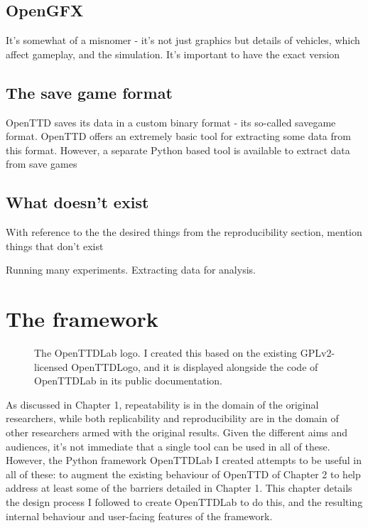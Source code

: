 \documentclass[logo,msc,dsti]{infthesis}    %
\begin{document}
\section{OpenGFX}

It's somewhat of a misnomer - it's not just graphics but details of vehicles, which affect gameplay, and the simulation. It's important to have the exact version

\section{The save game format}

OpenTTD saves its data in a custom binary format - its so-called savegame format. OpenTTD offers an extremely basic tool for extracting some data from this format. However, a separate Python based tool is available to extract data from save games

\section{What doesn't exist}

\begin{itemize}
\begin{item}
With reference to the the desired things from the reproducibility section, mention things that don't exist
\end{item}
\end{itemize}

Running many experiments. Extracting data for analysis.

\chapter{The framework}

\begin{figure}[h]
\centering

\caption{The OpenTTDLab logo. I created this based on the existing GPLv2-licensed OpenTTDLogo, and it is displayed alongside the code of OpenTTDLab in its public documentation.}
\label{fig:openttlab-logo}
\end{figure}

As discussed in Chapter 1, repeatability is in the domain of the original researchers, while both replicability and reproducibility are in the domain of other researchers armed with the original results. Given the different aims and audiences, it's not immediate that a single tool can be used in all of these. However, the Python framework OpenTTDLab I created attempts to be useful in all of these: to augment the existing behaviour of OpenTTD of Chapter 2 to help address at least some of the barriers detailed in Chapter 1. This chapter details the design process I followed to create OpenTTDLab to do this, and the resulting internal behaviour and user-facing features of the framework.
\end{document}
